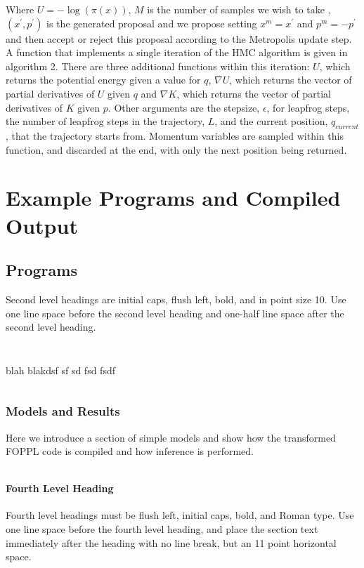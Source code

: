 \documentclass[twoside]{article}
\begin{document}
Where $U = -\log(\pi(x))$,  $M$ is the number of samples we wish to take , $(x^{'}, p^{'})$ is the generated proposal and we propose setting $x^{m} = x^{'}$ and $p^{m} = -p^{'}$ and then accept or reject this proposal according to the Metropolis update step. 
A function that implements a single iteration of the HMC algorithm is given in algorithm 2. There are three additional functions within this iteration: $U$, which returns the potential energy given a value for $q$,  $\nabla U$, which returns the vector of partial derivatives of $U$ given $q$ and $\nabla K$, which returns the vector of partial derivatives of $K$ given $p$. Other arguments are the stepsize, $\epsilon$, for leapfrog steps, the number of leapfrog steps in the trajectory, $L$, and the current position, $q_{current}$, that the trajectory starts from. Momentum variables are sampled within this function, and discarded at the end, with only the next position being returned. 

\section{Example Programs and Compiled Output}

\subsection{Programs}

Second level headings are initial caps, flush left, bold, and in point
size 10. Use one line space before the second level heading and one-half line
space after the second level heading.
\inputminted{clojure}{code/conditionalif.clj}
\inputminted{clojure}{code/conjugategauss.clj}
blah blakdsf sf sd fsd fsdf
\inputminted{clojure}{code/linearregression.clj}


\subsubsection{Models and Results}

Here we introduce a section of simple models and show how the transformed FOPPL code is compiled and how inference is performed. 
\inputminted{python}{code/lr_out.py}
\paragraph{Fourth Level Heading}

Fourth level headings must be flush left, initial caps, bold, and
Roman type.  Use one line space before the fourth level heading, and
place the section text immediately after the heading with no line
break, but an 11 point horizontal space.
\end{document}
